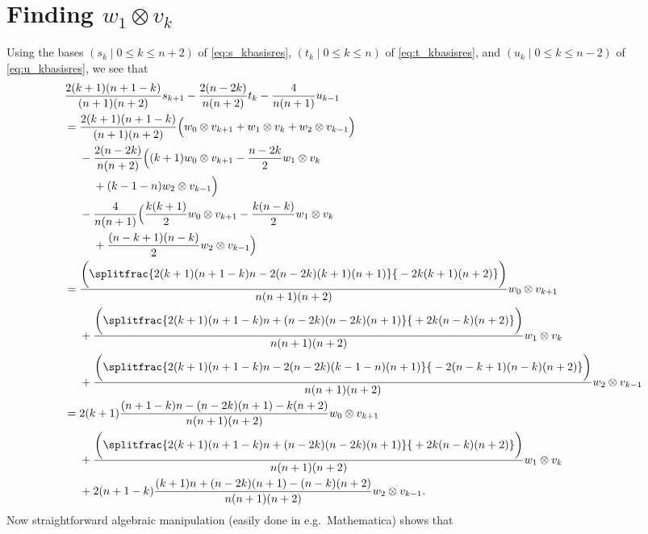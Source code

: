 \section{\texorpdfstring{Finding $w_1\otimes v_k$}{Finding w\_1 tensor v\_k}}\label{sec:w_1tensorv_k}
Using the bases $(s_k \mid 0\leq k\leq n+2)$ of \cref{eq:s_kbasisres}, $(t_k \mid 0\leq k\leq n)$ of \cref{eq:t_kbasisres}, and $(u_k \mid 0\leq k\leq n-2)$ of \cref{eq:u_kbasisres}, we see that
\begin{align*}
  &\dfrac{2(k+1)(n+1-k)}{(n+1)(n+2)}s_{k+1} - \dfrac{2(n-2k)}{n(n+2)}t_k - \dfrac{4}{n(n+1)}u_{k-1}\\
                                   &= \dfrac{2(k+1)(n+1-k)}{(n+1)(n+2)}\Bigl( w_0\otimes v_{k+1} + w_1\otimes v_{k} + w_2\otimes v_{k-1} \Bigr) \\*
                                   &\phantom{{}={}}{} - \dfrac{2(n-2k)}{n(n+2)}\Bigl( (k+1)w_0\otimes v_{k+1} - \dfrac{n-2k}{2}w_1\otimes v_k \\*
                                   &\phantom{{}={}-{}}{} + (k-1-n)w_2\otimes v_{k-1} \Bigr) \\*
                                   &\phantom{{}={}}{} - \dfrac{4}{n(n+1)}\Bigl( \dfrac{k(k+1)}{2}w_0\otimes v_{k+1} - \dfrac{k(n-k)}{2}w_1\otimes v_k \\*
                                   &\phantom{{}={}+{}}{}+ \dfrac{(n-k+1)(n-k)}{2}w_2\otimes v_{k-1} \Bigr) \\
  &= \dfrac{
    \biggl(\splitfrac{2(k+1)(n+1-k)n-2(n-2k)(k+1)(n+1)}{{}-2k(k+1)(n+2)}\biggr)
    }{n(n+1)(n+2)}w_0\otimes v_{k+1} \\*
  &\phantom{{}={}}{} + \dfrac{
    \biggl(\splitfrac{2(k+1)(n+1-k)n+(n-2k)(n-2k)(n+1)}{{}+2k(n-k)(n+2)}\biggr)
    }
    {n(n+1)(n+2)}w_1\otimes v_k \\*
  &\phantom{{}={}}{} + \dfrac{
    \biggl(\splitfrac{2(k+1)(n+1-k)n-2(n-2k)(k-1-n)(n+1)}{{}-2(n-k+1)(n-k)(n+2)}\biggr)
    }
    {n(n+1)(n+2)}w_2\otimes v_{k-1} \\
  &= 2(k+1)\dfrac{
    (n+1-k)n-(n-2k)(n+1)-k(n+2)
    }
    {n(n+1)(n+2)}w_0\otimes v_{k+1} \\*
  &\phantom{{}={}}{} + \dfrac{
    \biggl(\splitfrac{2(k+1)(n+1-k)n+(n-2k)(n-2k)(n+1)}{{}+2k(n-k)(n+2)}\biggr)
    }
    {n(n+1)(n+2)}w_1\otimes v_k \\*
  &\phantom{{}={}}{} + 2(n+1-k)\dfrac{
    (k+1)n + (n-2k)(n+1) - (n-k)(n+2)
    }
    {n(n+1)(n+2)}w_2\otimes v_{k-1}.
\end{align*}
Now straightforward algebraic manipulation (easily done in e.g.\ Mathematica) shows that 
